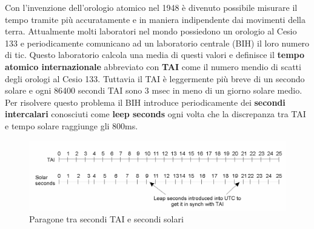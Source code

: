 Con l'invenzione dell'orologio atomico nel 1948 è divenuto possibile misurare il tempo tramite più accuratamente e in maniera indipendente dai movimenti della terra. Attualmente molti laboratori nel mondo possiedono un orologio al Cesio 133 e periodicamente comunicano ad un laboratorio centrale (BIH) il loro numero di tic. Questo laboratorio calcola una media di questi valori e definisce il \textbf{tempo atomico internazionale} abbreviato con \textbf{TAI} come il numero mendio di scatti degli orologi al Cesio 133. Tuttavia il TAI è leggermente più breve di un secondo solare e ogni 86400 secondi TAI sono 3 msec in meno di un giorno solare medio. Per risolvere questo problema il BIH introduce periodicamente dei \textbf{secondi intercalari} conosciuti come \textbf{leep seconds} ogni volta che la discrepanza tra TAI e tempo solare raggiunge gli 800ms.
\begin{figure}
\centering
\includegraphics[scale=0.4]{img/tai.png}
\caption{Paragone tra secondi TAI e secondi solari}\label{fig:tai}
\end{figure}
